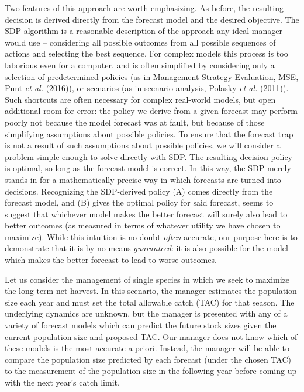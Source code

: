 \documentclass[3p]{elsarticle} %
\begin{document}
Two features of this approach are worth emphasizing. As before, the
resulting decision is derived directly from the forecast model and the
desired objective. The SDP algorithm is a reasonable description of the
approach any ideal manager would use -- considering all possible
outcomes from all possible sequences of actions and selecting the best
sequence. For complex models this process is too laborious even for a
computer, and is often simplified by considering only a selection of
predetermined policies (as in Management Strategy Evaluation, MSE, Punt
\emph{et al.} (2016)), or scenarios (as in scenario analysis, Polasky
\emph{et al.} (2011)). Such shortcuts are often necessary for complex
real-world models, but open additional room for error: the policy we
derive from a given forecast may perform poorly not because the model
forecast was at fault, but because of those simplifying assumptions
about possible policies. To ensure that the forecast trap is not a
result of such assumptions about possible policies, we will consider a
problem simple enough to solve directly with SDP. The resulting decision
policy is optimal, so long as the forecast model is correct. In this
way, the SDP merely stands in for a mathematically precise way in which
forecasts are turned into decisions. Recognizing the SDP-derived policy
(A) comes directly from the forecast model, and (B) gives the optimal
policy for said forecast, seems to suggest that whichever model makes
the better forecast will surely also lead to better outcomes (as
measured in terms of whatever utility we have chosen to maximize). While
this intuition is no doubt \emph{often} accurate, our purpose here is to
demonstrate that it is by no means \emph{guaranteed}: it is also
possible for the model which makes the better forecast to lead to worse
outcomes.

Let us consider the management of single species in which we seek to
maximize the long-term net harvest. In this scenario, the manager
estimates the population size each year and must set the total allowable
catch (TAC) for that season. The underlying dynamics are unknown, but
the manager is presented with any of a variety of forecast models which
can predict the future stock sizes given the current population size and
proposed TAC. Our manager does not know which of these models is the
most accurate a priori. Instead, the manager will be able to compare the
population size predicted by each forecast (under the chosen TAC) to the
measurement of the population size in the following year before coming
up with the next year's catch limit.
\end{document}
